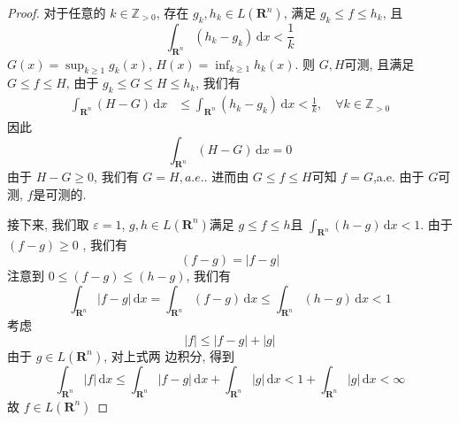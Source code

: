 \documentclass[../main.tex]{subfiles}
\begin{document}
\begin{proof}
    对于任意的 \(  k \in \mathbb{Z} _{> 0}  \), 存在 \(  g_{k},h_{k}\in L\left( \mathbf{R}^{n} \right)   \), 满足 \(  g_{k}\le f\le h_{k}  \), 且 \[
    \int_{\mathbf{R}^{n}}\left( h_{k}-g_{k} \right)\,\mathrm{d} x< \frac{1 }{k }  
    \]   \(  G\left( x \right)= \sup _{k\ge 1}g_{k}\left( x \right)    \), \(  H\left( x \right)= \inf _{k\ge 1}h_{k}\left( x \right)    \). 则 \(  G,H  \)可测, 且满足 \(  G\le f\le H  \), 由于 \(  g_{k}\le G\le H\le h_{k}  \), 我们有 \[
   \begin{aligned}
   \int_{\mathbf{R}^{n}}\left( H-G \right)\,\mathrm{d} x &\le   
     \int_{\mathbf{R}^{n}}\left( h_{k}-g_{k} \right)\,\mathrm{d} x< \frac{1 }{k },\quad \forall k\in \mathbb{Z} _{> 0}  
   \end{aligned}   
    \]    因此 \[
    \int_{\mathbf{R}^{n}}\left(  H-G  \right)\,\mathrm{d} x= 0 
    \]由于 \(  H-G   \ge 0\), 我们有 \(  G= H, a.e.  \). 进而由 \(  G\le f\le H  \)可知 \(  f= G  \),a.e. 由于 \(  G  \)可测,  \(  f  \)是可测的.      

   接下来, 我们取 \(   \varepsilon = 1  \), \(  g,h\in L\left( \mathbf{R}^{n} \right)   \)满足 \(  g\le f\le h  \)且 \(  \int_{\mathbf{R}^{n}}\left( h-g \right)\,\mathrm{d} x<  1  \).    
    由于 \(  \left( f-g \right)\ge 0   \) , 我们有 \[
    \left( f-g \right)= \left| f-g \right|  
    \]注意到 \(  0\le \left( f-g \right)\le \left( h-g \right)    \), 我们有 \[
    \int_{\mathbf{R}^{n}}\left| f-g \right|\,\mathrm{d} x= \int_{\mathbf{R}^{n}}\left( f-g \right)\,\mathrm{d} x\le \int_{\mathbf{R}^{n}}\left( h-g \right)\,\mathrm{d} x<  1   
    \]考虑 \[
    \left| f \right|\le \left| f-g \right|+ \left| g \right|   
    \] 由于 \(  g\in L\left( \mathbf{R}^{n} \right)   \), 对上式两 边积分, 得到 \[
     \int_{\mathbf{R}^{n}}\left| f \right|\,\mathrm{d} x\le \int_{\mathbf{R}^{n}}\left| f-g \right|\,\mathrm{d} x+ \int_{\mathbf{R}^{n}}\left| g \right|   \,\mathrm{d} x<  1 + \int_{\mathbf{R}^{n}}\left| g \right|\,\mathrm{d} x< \infty 
     \]故 \(  f \in L\left( \mathbf{R}^{n} \right)   \) 
\end{proof}
\end{document}
